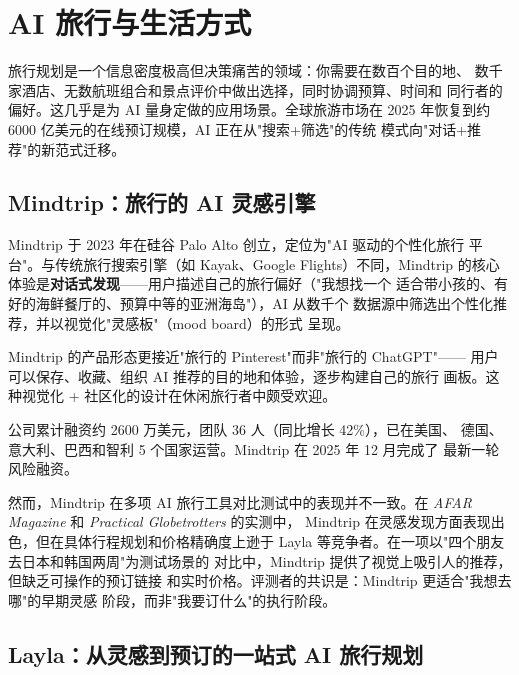 
\section{AI 旅行与生活方式}
\label{sec:life-travel}

旅行规划是一个信息密度极高但决策痛苦的领域：你需要在数百个目的地、
数千家酒店、无数航班组合和景点评价中做出选择，同时协调预算、时间和
同行者的偏好。这几乎是为 AI 量身定做的应用场景。全球旅游市场在 2025
年恢复到约 6000 亿美元的在线预订规模，AI 正在从"搜索+筛选"的传统
模式向"对话+推荐"的新范式迁移。

\subsection{Mindtrip：旅行的 AI 灵感引擎}
\label{subsec:mindtrip}

Mindtrip 于 2023 年在硅谷 Palo Alto 创立，定位为"AI 驱动的个性化旅行
平台"。与传统旅行搜索引擎（如 Kayak、Google Flights）不同，Mindtrip
的核心体验是\textbf{对话式发现}——用户描述自己的旅行偏好（"我想找一个
适合带小孩的、有好的海鲜餐厅的、预算中等的亚洲海岛"），AI 从数千个
数据源中筛选出个性化推荐，并以视觉化"灵感板"（mood board）的形式
呈现。

Mindtrip 的产品形态更接近"旅行的 Pinterest"而非"旅行的 ChatGPT"——
用户可以保存、收藏、组织 AI 推荐的目的地和体验，逐步构建自己的旅行
画板。这种视觉化 + 社区化的设计在休闲旅行者中颇受欢迎。

公司累计融资约 2600 万美元，团队 36 人（同比增长 42\%），已在美国、
德国、意大利、巴西和智利 5 个国家运营。Mindtrip 在 2025 年 12 月完成了
最新一轮风险融资。

然而，Mindtrip 在多项 AI 旅行工具对比测试中的表现并不一致。在
\textit{AFAR Magazine} 和 \textit{Practical Globetrotters} 的实测中，
Mindtrip 在灵感发现方面表现出色，但在具体行程规划和价格精确度上逊于
Layla 等竞争者。在一项以"四个朋友去日本和韩国两周"为测试场景的
对比中，Mindtrip 提供了视觉上吸引人的推荐，但缺乏可操作的预订链接
和实时价格。评测者的共识是：Mindtrip 更适合"我想去哪"的早期灵感
阶段，而非"我要订什么"的执行阶段。


\subsection{Layla：从灵感到预订的一站式 AI 旅行规划}
\label{subsec:layla}

